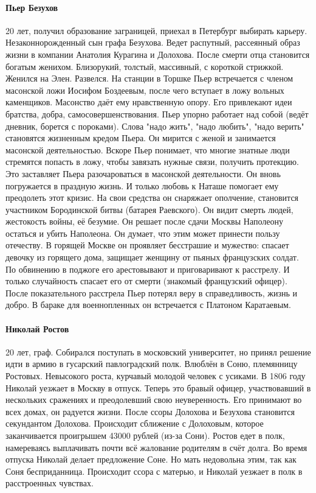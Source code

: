 \documentclass{article}
\begin{document}
\paragraph{Пьер Безухов}
20 лет, получил образование заграницей, приехал в Петербург выбирать карьеру. Незаконнорожденный сын графа Безухова.
Ведет распутный, рассеянный образ жизни в компании Анатолия Курагина и Долохова. После смерти отца становится
богатым женихом. Близорукий, толстый, массивный, с короткой стрижкой. Женился на Элен. Развелся.
На станции в Торшке Пьер встречается с членом масонской ложи Иосифом Боздеевым, после чего вступает в ложу вольных
каменщиков. Масонство даёт ему нравственную опору. Его привлекают идеи братства, добра, самосовершенствования.
Пьер упорно работает над собой (ведёт дневник, борется с пороками). Слова "надо жить", "надо любить", "надо верить"
становятся жизненным кредом Пьера. Он мирится с женой и занимается масонской деятельностью. Вскоре Пьер понимает,
что многие знатные люди стремятся попасть в ложу, чтобы завязать нужные связи, получить протекцию. Это заставляет
Пьера разочароваться в масонской деятельности. Он вновь погружается в праздную жизнь. И только любовь к Наташе
помогает ему преодолеть этот кризис.
На свои средства он снаряжает ополчение, становится участником Бородинской битвы (батарея Раевского). Он видит смерть
людей, жестокость войны, её безумие. Он решает после сдачи Москвы Наполеону остаться и убить Наполеона. Он думает, что
этим может принести пользу отечеству. В горящей Москве он проявляет бесстрашие и мужество: спасает девочку из горящего
дома, защищает женщину от пьяных французских солдат. По обвинению в поджоге его арестовывают и приговаривают к
расстрелу. И только случайность спасает его от смерти (знакомый французский офицер). После показательного расстрела
Пьер потерял веру в справедливость, жизнь и добро. В бараке для военнопленных он встречается с Платоном Каратаевым.
\paragraph{Николай Ростов}
20 лет, граф. Собирался поступать в московский университет, но принял решение идти в армию в гусарский павлоградский
полк. Влюблён в Соню, племянницу Ростовых. Невысокого роста, курчавый молодой человек с усиками.
В 1806 году Николай уезжает в Москву в отпуск.
Теперь это бравый офицер, участвовавший в нескольких сражениях и преодолевший свою неуверенность. Его принимают
во всех домах, он радуется жизни. После ссоры Долохова и Безухова становится секундантом Долохова.
Происходит сближение с Долоховым, которое заканчивается проигрышем 43000 рублей (из-за Сони). Ростов едет в полк,
намереваясь выплачивать почти всё жалование родителям в счёт долга. Во время отпуска Николай делает предложение
Соне. Но мать недовольна этим, так как Соня бесприданница. Происходит ссора с матерью, и Николай уезжает в полк
в расстроенных чувствах.
\end{document}

